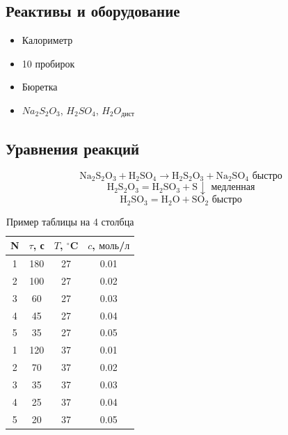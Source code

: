 \documentclass[a4paper, 12pt]{article}
\begin{document}
\subsection*{Реактивы и оборудование}

\begin{itemize}[label=--]
    \item Калориметр
    \item 10 пробирок
    \item Бюретка
    \item $Na_2 S_2 O_3$, $H_2 S O_4$, $H_2 O_{\text{дист}}$
\end{itemize}

\subsection*{Уравнения реакций}
\[
    \text{Na}_2 \text{S}_2 \text{O}_3 + \text{H}_2 \text{S} \text{O}_4  \rightarrow \text{H}_2 \text{S}_2 \text{O}_3  + \text{Na}_2 \text{S} \text{O}_4 \text{ быстро}
\]
\[
    \text{H}_2 \text{S}_2 \text{O}_3 = \text{H}_2 \text{S} \text{O}_3 + \text{S} \downarrow \text{ медленная}
\]
\[
    \text{H}_2 \text{S} \text{O}_3 = \text{H}_2 \text{O} + \text{S} \text{O}_2 \text{ быстро}
\]

\begin{table}[h!]
    \centering
    \begin{tabular}{|c|c|c|c|} %
        \hline
        N & $\tau$, с & $T$, $^\circ$C & $c$, $\text{моль}$/$\text{л}$ \\
        \hline
        1 & 180       & 27             & 0.01                          \\
        \hline
        2 & 100       & 27             & 0.02                          \\
        \hline
        3 & 60        & 27             & 0.03                          \\
        \hline
        4 & 45        & 27             & 0.04                          \\
        \hline
        5 & 35        & 27             & 0.05                          \\
        \hline
        1 & 120       & 37             & 0.01                          \\
        \hline
        2 & 70        & 37             & 0.02                          \\
        \hline
        3 & 35        & 37             & 0.03                          \\
        \hline
        4 & 25        & 37             & 0.04                          \\
        \hline
        5 & 20        & 37             & 0.05                          \\
        \hline
    \end{tabular}
    \caption{Пример таблицы на 4 столбца}
    \label{tab:my_table}
\end{table}
\end{document}

